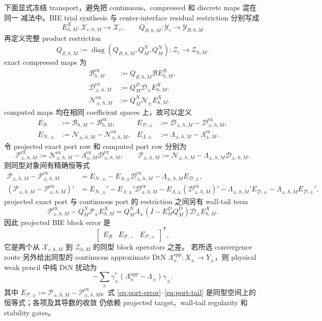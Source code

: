 \documentclass[UTF8,fontset=fandol,11pt,a4paper]{ctexart}
\newcommand{\cB}{\mathcal B}
\newcommand{\cD}{\mathcal D}
\newcommand{\cN}{\mathcal N}
\newcommand{\cP}{\mathcal P}
\begin{document}
下面显式冻结 transport，避免把 continuous、compressed 和 discrete maps 混在同一
减法中。BIE trial synthesis 与 center-interface residual restriction 分别写成
\[
  E_{h,M}^X:\mathcal X_{c,h,M}\to\mathcal X_c,
  \qquad
  Q_{B,h,M}:\mathcal Y_c\to\mathcal Y_{B,h,M}
\]
再定义完整 product restriction
\[
  Q_{Z,h,M}:=\operatorname{diag}(Q_{B,h,M},Q_M^N,Q_M^N):
  \mathcal Z_c\longrightarrow\mathcal Z_{h,M}.
\]
exact compressed maps 为
\begin{align*}
  \cB_{h,M}^{\mathrm{ex}}&:=Q_{B,h,M}\cB E_{h,M}^X,\\
  \cD_{\pm,h,M}^{\mathrm{ex}}&:=Q_M^D\cD_\pm E_{h,M}^X,\\
  \cN_{\pm,h,M}^{\mathrm{ex}}&:=Q_M^N\cN_\pm E_{h,M}^X.
\end{align*}
computed maps 均在相同 coefficient spaces 上，故可以定义
\begin{align*}
  E_{\cB}&:=\cB_{h,M}-\cB_{h,M}^{\mathrm{ex}},
  &E_{\cD,\pm}&:=\cD_{\pm,h,M}-\cD_{\pm,h,M}^{\mathrm{ex}},\\
  E_{\cN,\pm}&:=\cN_{\pm,h,M}-\cN_{\pm,h,M}^{\mathrm{ex}},
  &E_{\Lambda,\pm}&:=\Lambda_{\pm,h,M}-\Lambda_{\pm,M}^{\mathrm{ex}}.
\end{align*}
令 projected exact port row 和 computed port row 分别为
\[
  \cP_{\pm,h,M}^{\mathrm{ex}}
  :=\cN_{\pm,h,M}^{\mathrm{ex}}
    -\Lambda_{\pm,M}^{\mathrm{ex}}\cD_{\pm,h,M}^{\mathrm{ex}},
  \qquad
  \cP_{\pm,h,M}:=\cN_{\pm,h,M}
    -\Lambda_{\pm,h,M}\cD_{\pm,h,M}.
\]
则同型对象间有精确恒等式
\begin{align}
  \cP_{\pm,h,M}-\cP_{\pm,h,M}^{\mathrm{ex}}
  &=E_{\cN,\pm}-E_{\Lambda,\pm}\cD_{\pm,h,M}^{\mathrm{ex}}
    -\Lambda_{\pm,h,M}E_{\cD,\pm},\label{eq:port-error}\\
  (\cP_{\pm,h,M}-\cP_{\pm,h,M}^{\mathrm{ex}})'
  &=E_{\cN,\pm}'-E_{\Lambda,\pm}'\cD_{\pm,h,M}^{\mathrm{ex}}
    -E_{\Lambda,\pm}(\cD_{\pm,h,M}^{\mathrm{ex}})'
    -\Lambda_{\pm,h,M}'E_{\cD,\pm}
    -\Lambda_{\pm,h,M}E_{\cD,\pm}'.\label{eq:port-derivative-error}
\end{align}
projected exact port 与 continuous port 的 restriction 之间另有 wall-tail term
\begin{equation}
  \cP_{\pm,h,M}^{\mathrm{ex}}
  -Q_M^N\cP_\pm E_{h,M}^X
  =Q_M^N\Lambda_\pm(I-E_M^DQ_M^D)\cD_\pm E_{h,M}^X.
  \label{eq:port-tail}
\end{equation}
因此 projected BIE block error 是
\[
  \begin{bmatrix}E_{\cB}&E_{\cP,-}&E_{\cP,+}\end{bmatrix}^{\mathsf T},
\]
它是两个从 $\mathcal X_{c,h,M}$ 到 $\mathcal Z_{h,M}$ 的同型 block operators 之差。
若所选 convergence route 另外给出同型的 continuous approximate DtN
$\Lambda_\pm^{\mathrm{app}}:X_\pm\to Y_\pm$，则 physical weak pencil 中纯 DtN 扰动为
\[
  -\sum_\pm\gamma_\pm^*
  (\Lambda_\pm^{\mathrm{app}}-\Lambda_\pm)\gamma_\pm.
\]
其中 $E_{\cP,\pm}:=\cP_{\pm,h,M}-\cP_{\pm,h,M}^{\mathrm{ex}}$。式
\eqref{eq:port-error}--\eqref{eq:port-tail} 是同型空间上的恒等式；各项及其导数的收敛
仍依赖 projected target、wall-tail regularity 和 stability gates。
\end{document}
